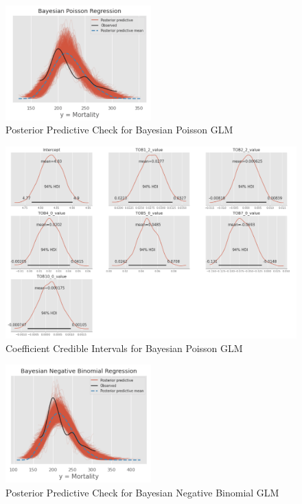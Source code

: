 \documentclass{article}
\begin{document}
\begin{figure}
\centering
\includegraphics[width=0.5\textwidth]{poisson_ppc.png}
\caption{Posterior Predictive Check for Bayesian Poisson GLM}
\label{fig:figure16}
\end{figure}

\begin{figure}
\centering
\includegraphics[width=1.0\textwidth]{poisson_pos.png}
\caption{Coefficient Credible Intervals for Bayesian Poisson GLM}
\label{fig:figure17}
\end{figure}

\begin{figure}
\centering
\includegraphics[width=0.5\textwidth]{nb_ppc.png}
\caption{Posterior Predictive Check for Bayesian Negative Binomial GLM}
\label{fig:figure18}
\end{figure}
\end{document}
